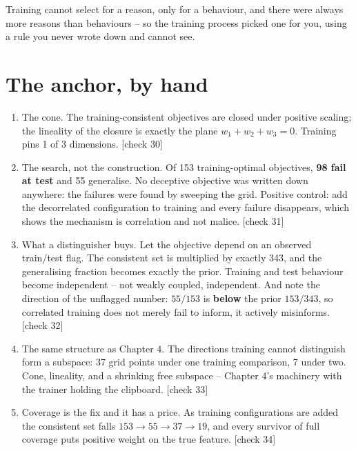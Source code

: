 \begin{whyboxnt}
Training cannot select for a reason, only for a behaviour, and there were always more reasons than behaviours -- so the training process picked one for you, using a rule you never wrote down and cannot see.
\end{whyboxnt}

\section*{The anchor, by hand}

\begin{enumerate}
\item The cone. The training-consistent objectives are closed under positive scaling; the lineality of the closure is exactly the plane $w_1+w_2+w_3=0$. Training pins 1 of 3 dimensions. [check 30]
\item The search, not the construction. Of 153 training-optimal objectives, \textbf{98 fail at test} and 55 generalise. No deceptive objective was written down anywhere: the failures were found by sweeping the grid. Positive control: add the decorrelated configuration to training and every failure disappears, which shows the mechanism is correlation and not malice. [check 31]
\item What a distinguisher buys. Let the objective depend on an observed train/test flag. The consistent set is multiplied by exactly 343, and the generalising fraction becomes exactly the prior. Training and test behaviour become independent -- not weakly coupled, independent. And note the direction of the unflagged number: $55/153$ is \textbf{below} the prior $153/343$, so correlated training does not merely fail to inform, it actively misinforms. [check 32]
\item The same structure as Chapter 4. The directions training cannot distinguish form a subspace: 37 grid points under one training comparison, 7 under two. Cone, lineality, and a shrinking free subspace -- Chapter 4's machinery with the trainer holding the clipboard. [check 33]
\item Coverage is the fix and it has a price. As training configurations are added the consistent set falls $153 \to 55 \to 37 \to 19$, and every survivor of full coverage puts positive weight on the true feature. [check 34]
\end{enumerate}


